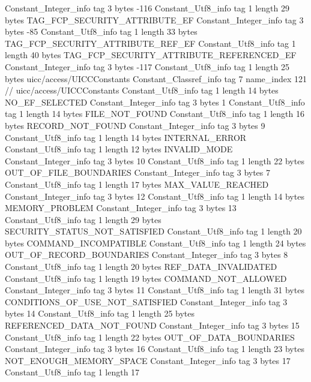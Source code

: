 {{{		}
		Constant_Integer_info {
			tag	3
			bytes	-116
		}
		Constant_Utf8_info {
			tag	1
			length	29
			bytes	TAG_FCP_SECURITY_ATTRIBUTE_EF
		}
		Constant_Integer_info {
			tag	3
			bytes	-85
		}
		Constant_Utf8_info {
			tag	1
			length	33
			bytes	TAG_FCP_SECURITY_ATTRIBUTE_REF_EF
		}
		Constant_Utf8_info {
			tag	1
			length	40
			bytes	TAG_FCP_SECURITY_ATTRIBUTE_REFERENCED_EF
		}
		Constant_Integer_info {
			tag	3
			bytes	-117
		}
		Constant_Utf8_info {
			tag	1
			length	25
			bytes	uicc/access/UICCConstants
		}
		Constant_Classref_info {
			tag	7
			name_index	121		// uicc/access/UICCConstants
		}
		Constant_Utf8_info {
			tag	1
			length	14
			bytes	NO_EF_SELECTED
		}
		Constant_Integer_info {
			tag	3
			bytes	1
		}
		Constant_Utf8_info {
			tag	1
			length	14
			bytes	FILE_NOT_FOUND
		}
		Constant_Utf8_info {
			tag	1
			length	16
			bytes	RECORD_NOT_FOUND
		}
		Constant_Integer_info {
			tag	3
			bytes	9
		}
		Constant_Utf8_info {
			tag	1
			length	14
			bytes	INTERNAL_ERROR
		}
		Constant_Utf8_info {
			tag	1
			length	12
			bytes	INVALID_MODE
		}
		Constant_Integer_info {
			tag	3
			bytes	10
		}
		Constant_Utf8_info {
			tag	1
			length	22
			bytes	OUT_OF_FILE_BOUNDARIES
		}
		Constant_Integer_info {
			tag	3
			bytes	7
		}
		Constant_Utf8_info {
			tag	1
			length	17
			bytes	MAX_VALUE_REACHED
		}
		Constant_Integer_info {
			tag	3
			bytes	12
		}
		Constant_Utf8_info {
			tag	1
			length	14
			bytes	MEMORY_PROBLEM
		}
		Constant_Integer_info {
			tag	3
			bytes	13
		}
		Constant_Utf8_info {
			tag	1
			length	29
			bytes	SECURITY_STATUS_NOT_SATISFIED
		}
		Constant_Utf8_info {
			tag	1
			length	20
			bytes	COMMAND_INCOMPATIBLE
		}
		Constant_Utf8_info {
			tag	1
			length	24
			bytes	OUT_OF_RECORD_BOUNDARIES
		}
		Constant_Integer_info {
			tag	3
			bytes	8
		}
		Constant_Utf8_info {
			tag	1
			length	20
			bytes	REF_DATA_INVALIDATED
		}
		Constant_Utf8_info {
			tag	1
			length	19
			bytes	COMMAND_NOT_ALLOWED
		}
		Constant_Integer_info {
			tag	3
			bytes	11
		}
		Constant_Utf8_info {
			tag	1
			length	31
			bytes	CONDITIONS_OF_USE_NOT_SATISFIED
		}
		Constant_Integer_info {
			tag	3
			bytes	14
		}
		Constant_Utf8_info {
			tag	1
			length	25
			bytes	REFERENCED_DATA_NOT_FOUND
		}
		Constant_Integer_info {
			tag	3
			bytes	15
		}
		Constant_Utf8_info {
			tag	1
			length	22
			bytes	OUT_OF_DATA_BOUNDARIES
		}
		Constant_Integer_info {
			tag	3
			bytes	16
		}
		Constant_Utf8_info {
			tag	1
			length	23
			bytes	NOT_ENOUGH_MEMORY_SPACE
		}
		Constant_Integer_info {
			tag	3
			bytes	17
		}
		Constant_Utf8_info {
			tag	1
			length	17
}}}
